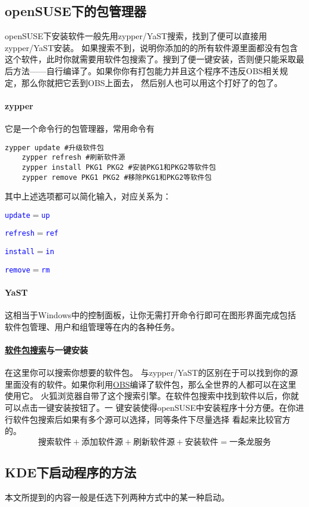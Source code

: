 \documentclass[10pt,openany]{book}
\newcommand{\command}[1]{\texttt{\textcolor{blue}{#1}}}
\newcommand{\simp}[2]{\command{#1}$=$\command{#2}}
\begin{document}
\subsection[包管理器]{openSUSE下的包管理器}
openSUSE下安装软件一般先用zypper/YaST搜索，找到了便可以直接用zypper/YaST安装。
如果搜索不到，说明你添加的的所有软件源里面都没有包含这个软件，此时你就需要用软件包搜索了。搜到了便一键安装，否则便只能采取最后方法——自行编译了。如果你你有打包能力并且这个程序不违反OBS相关规定，那么你就把它丢到OBS上面去，
然后别人也可以用这个打好了的包了。
\paragraph{zypper}\label{pre} 它是一个命令行的包管理器，常用命令有
\begin{Verbatim}[formatcom=\color{codecolor}]
    zypper update #升级软件包
    zypper refresh #刷新软件源
    zypper install PKG1 PKG2 #安装PKG1和PKG2等软件包
    zypper remove PKG1 PKG2 #移除PKG1和PKG2等软件包
\end{Verbatim}
其中上述选项都可以简化输入，对应关系为：\begin{inparaitem}
 \item \simp{update}{up}
 \item \simp{refresh}{ref}
 \item \simp{install}{in}
 \item \simp{remove}{rm}
\end{inparaitem}
\paragraph{YaST} 这相当于Windows中的控制面板，让你无需打开命令行即可在图形界面完成包括软件包管理、用户和组管理等在内的各种任务。
\paragraph[软件包搜索与一键安装]{\href{http://software.opensuse.org/packages}{软件包搜索}与一键安装} 在这里你可以搜索你想要的软件包。
与zypper/YaST的区别在于可以找到你的源里面没有的软件。如果你利用\href{https://build.opensuse.org/}{OBS}编译了软件包，那么全世界的人都可以在这里使用它。
火狐浏览器自带了这个搜索引擎。在软件包搜索中找到软件以后，你就可以点击一键安装按钮了。一
键安装使得openSUSE中安装程序十分方便。在你进行软件包搜索后如果有多个源可以选择，同等条件下尽量选择
看起来比较官方的。\[\text{搜索软件}+\text{添加软件源}+\text{刷新软件源}+\text{安装软件}=\text{一条龙服务}\]
\subsection{KDE下启动程序的方法}
本文所提到的内容一般是任选下列两种方式中的某一种启动。
\end{document}
